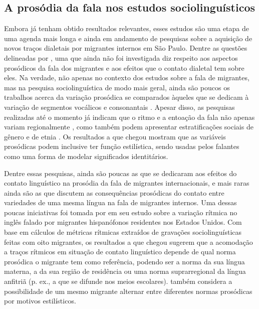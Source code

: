 \documentclass[
    a4paper,	%
    12pt,	%
    ]{article}	%
\begin{document}
	\subsection{A prosódia da fala nos estudos sociolinguísticos}
	\label{prosodia-socio}

Embora já tenham obtido resultados relevantes, esses estudos são uma etapa de
uma agenda mais longa e ainda em andamento de pesquisas sobre a aquisição de
novos traços dialetais por migrantes internos em São Paulo. Dentre as questões
delineadas por \citet{Oushiro2018}, uma que ainda não foi investigada diz
respeito aos aspectos prosódicos da fala dos migrantes e aos efeitos que o
contato dialetal tem sobre eles. Na verdade, não apenas no contexto dos estudos
sobre a fala de migrantes, mas na pesquisa sociolinguística de modo mais geral,
ainda são poucos os trabalhos acerca da variação prosódica se comparados àqueles
que se dedicam à variação de segmentos vocálicos e consonantais
\citep{Thomas2013, Hay.Drager2007}. Apesar disso, as pesquisas realizadas até o
momento já indicam que o ritmo e a entoação da fala não apenas variam
regionalmente \citep{Clopper.Smiljanic2015, Grabe.etal2000}, como também podem
apresentar estratificações sociais de gênero \citep{Lowry2011} e de etnia
\citep{Thomas2013, Szakay2006}. Os resultados a que \citet{Podesva2011} chegou
mostram que as variáveis prosódicas podem inclusive ter função estilística,
sendo usadas pelos falantes como uma forma de modelar significados identitários.

Dentre essas pesquisas, ainda são poucas as que se dedicaram aos efeitos do
contato linguístico na prosódia da fala de migrantes internacionais, e mais
raras ainda são as que discutem as consequências prosódicas do contato entre
variedades de uma mesma língua na fala de migrantes internos. Uma dessas poucas
iniciativas foi tomada por \citet{Carter2005} em seu estudo sobre a variação
rítmica no inglês falado por migrantes hispanófonos residentes nos Estados
Unidos. Com base em cálculos de métricas rítmicas extraídos de gravações
sociolinguísticas feitas com oito migrantes, os resultados a que
\citet{Carter2005} chegou sugerem que a acomodação a traços rítmicos em situação
de contato linguístico depende de qual norma prosódica o migrante tem como
referência, podendo ser a norma da sua língua materna, a da sua região de
residência ou uma norma suprarregional da língua anfitriã (p. ex., a que se
difunde nos meios escolares). \citet{Carter2005} também considera a
possibilidade de um mesmo migrante alternar entre diferentes normas prosódicas
por motivos estilísticos.
\end{document}
